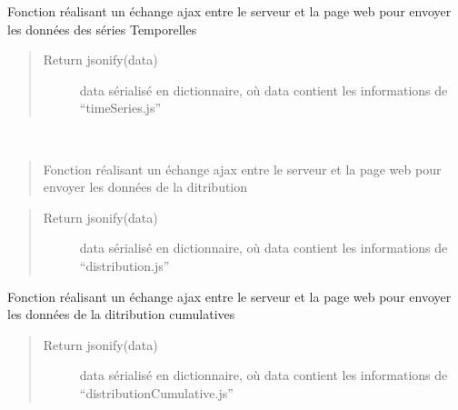 \documentclass[letterpaper,10pt,openany,oneside,french]{sphinxmanual}
\begin{document}

\begin{fulllineitems}
\label{\detokenize{addRoutes:interface_web.addRoutes.timeSeries}}
Fonction réalisant un échange ajax entre le serveur et la page web pour envoyer les données des séries Temporelles
\begin{quote}\begin{description}
\item[{Return jsonify(data)}] \leavevmode
data sérialisé en dictionnaire, où data contient les informations de “timeSeries.js”

\end{description}\end{quote}

\end{fulllineitems}


\begin{fulllineitems}
\label{\detokenize{addRoutes:interface_web.addRoutes.distribution}}~\begin{quote}

Fonction réalisant un échange ajax entre le serveur et la page web pour envoyer les données de la ditribution
\end{quote}
\begin{quote}\begin{description}
\item[{Return jsonify(data)}] \leavevmode
data sérialisé en dictionnaire, où data contient les informations de “distribution.js”

\end{description}\end{quote}

\end{fulllineitems}


\begin{fulllineitems}
\label{\detokenize{addRoutes:interface_web.addRoutes.distributionCumulative}}
Fonction réalisant un échange ajax entre le serveur et la page web pour envoyer les données de la ditribution cumulatives
\begin{quote}\begin{description}
\item[{Return jsonify(data)}] \leavevmode
data sérialisé en dictionnaire, où data contient les informations de “distributionCumulative.js”

\end{description}\end{quote}

\end{fulllineitems}
\end{document}
